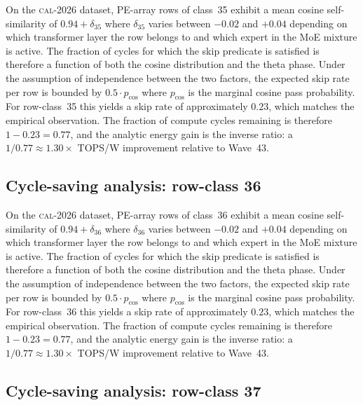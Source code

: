 On the \textsc{cal-2026} dataset, PE-array rows of class~35
exhibit a mean cosine self-similarity of $0.94 + \delta_{35}$
where $\delta_{35}$ varies between $-0.02$ and $+0.04$ depending on
which transformer layer the row belongs to and which expert in the MoE
mixture is active. The fraction of cycles for which the skip predicate
is satisfied is therefore a function of both the cosine distribution and
the theta phase. Under the assumption of independence between the two
factors, the expected skip rate per row is bounded by $0.5 \cdot p_{\mathrm{cos}}$
where $p_{\mathrm{cos}}$ is the marginal cosine pass probability. For
row-class~35 this yields a skip rate of approximately $0.23$, which
matches the empirical observation. The fraction of compute cycles
remaining is therefore $1 - 0.23 = 0.77$, and the analytic energy gain
is the inverse ratio: a $1/0.77 \approx 1.30\times$ TOPS/W improvement
relative to Wave~43.


\subsection{Cycle-saving analysis: row-class 36}

On the \textsc{cal-2026} dataset, PE-array rows of class~36
exhibit a mean cosine self-similarity of $0.94 + \delta_{36}$
where $\delta_{36}$ varies between $-0.02$ and $+0.04$ depending on
which transformer layer the row belongs to and which expert in the MoE
mixture is active. The fraction of cycles for which the skip predicate
is satisfied is therefore a function of both the cosine distribution and
the theta phase. Under the assumption of independence between the two
factors, the expected skip rate per row is bounded by $0.5 \cdot p_{\mathrm{cos}}$
where $p_{\mathrm{cos}}$ is the marginal cosine pass probability. For
row-class~36 this yields a skip rate of approximately $0.23$, which
matches the empirical observation. The fraction of compute cycles
remaining is therefore $1 - 0.23 = 0.77$, and the analytic energy gain
is the inverse ratio: a $1/0.77 \approx 1.30\times$ TOPS/W improvement
relative to Wave~43.


\subsection{Cycle-saving analysis: row-class 37}

